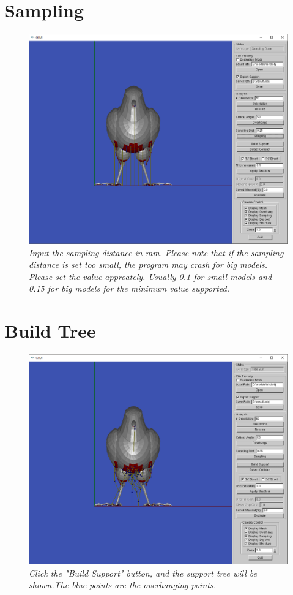 \documentclass[11pt, a4paper]{article}
\begin{document}
	\section{Sampling}
	\begin{figure}[H]
  		\centering
      	\includegraphics[width=1.0\textwidth]{sampling.png}
  	\caption{\textit{Input the sampling distance in mm. Please note that if the sampling distance is set too small, the program may crash for big models. Please set the value approately. Usually 0.1 for small models and 0.15 for big models for the minimum value supported.}}
	\end{figure}
	\section{Build Tree}
	\begin{figure}[H]
  		\centering
      	\includegraphics[width=1.0\textwidth]{build.png}
  	\caption{\textit{Click the "Build Support" button, and the support tree will be shown.The blue points are the overhanging points.}}
	\end{figure}
\end{document}
